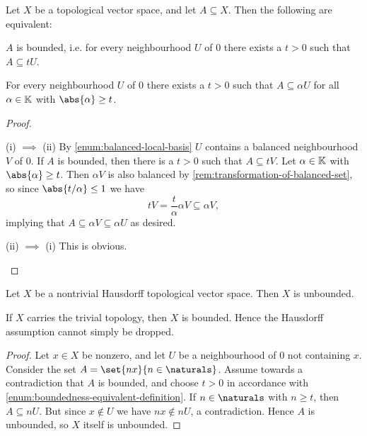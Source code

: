 \documentclass[article, a4paper, 11pt, oneside]{memoir}
\numberwithin{equation}{chapter}
\begin{document}
\begin{corollary}
    \label{thm:boundedness-equivalent-definitions}
    Let $X$ be a topological vector space, and let $A \subseteq X$. Then the following are equivalent:
    \begin{enumcor}
        \item $A$ is bounded, i.e. for every neighbourhood $U$ of $0$ there exists a $t > 0$ such that $A \subseteq tU$.
        \item \label{enum:boundedness-equivalent-definition} For every neighbourhood $U$ of $0$ there exists a $t > 0$ such that $A \subseteq \alpha U$ for all $\alpha \in \mathbb{K}$ with $\abs{\alpha} \geq t$.
    \end{enumcor}
\end{corollary}

\begin{proof}
\begin{proofsec}
    \item[(i) $\implies$ (ii)]
    By \cref{enum:balanced-local-basis} $U$ contains a balanced neighbourhood $V$ of $0$. If $A$ is bounded, then there is a $t > 0$ such that $A \subseteq tV$. Let $\alpha \in \mathbb{K}$ with $\abs{\alpha} \geq t$. Then $\alpha V$ is also balanced by \cref{rem:transformation-of-balanced-set}, so since $\abs{t/\alpha} \leq 1$ we have
    \begin{equation*}
        tV
            = \frac{t}{\alpha} \alpha V
            \subseteq \alpha V,
    \end{equation*}
    implying that $A \subseteq \alpha V \subseteq \alpha U$ as desired.

    \item[(ii) $\implies$ (i)]
    This is obvious.
\end{proofsec}
\end{proof}


\begin{corollary}
    \label{enum:Hausdorff-space-unbounded}
    Let $X$ be a nontrivial Hausdorff topological vector space. Then $X$ is unbounded.
\end{corollary}
%
If $X$ carries the trivial topology, then $X$ is bounded. Hence the Hausdorff assumption cannot simply be dropped.

\begin{proof}
    Let $x \in X$ be nonzero, and let $U$ be a neighbourhood of $0$ not containing $x$. Consider the set $A = \set{nx}{n \in \naturals}$. Assume towards a contradiction that $A$ is bounded, and choose $t > 0$ in accordance with \cref{enum:boundedness-equivalent-definition}. If $n \in \naturals$ with $n \geq t$, then $A \subseteq nU$. But since $x \not\in U$ we have $nx \not\in nU$, a contradiction. Hence $A$ is unbounded, so $X$ itself is unbounded.
\end{proof}
\end{document}
